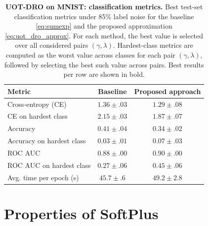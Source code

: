 \documentclass{article}
\theoremstyle{plain}
\theoremstyle{definition}
\theoremstyle{remark}
\begin{document}
\begin{table}
\centering
\small
\setlength{\tabcolsep}{5pt}
\caption{\textbf{UOT-DRO on MNIST: classification metrics.}
Best test-set classification metrics under 85\% label noise for the baseline \eqref{eq:sumexp} and the proposed approximation \eqref{eq:uot_dro_approx}. For each method, the best value is selected over all considered pairs $(\gamma,\lambda)$. Hardest-class metrics are computed as the worst value across classes for each pair $(\gamma,\lambda)$, followed by selecting the best such value across pairs. Best results per row are shown in bold.}
\label{tab:app_uot_dro_mnist_metrics}
\begin{tabular}{l|c|c}
\toprule
Metric & Baseline & Proposed approach \\
\midrule
Cross-entropy (CE)
& $1.36\pm.03$
& $\bm{1.29\pm.08}$ \\
CE on hardest class
& $2.15\pm.03$
& $\bm{1.87\pm.07}$ \\
Accuracy
& $\bm{0.41\pm.04}$
& $0.34\pm.02$ \\
Accuracy on hardest class
& $0.03\pm.01$
& $\bm{0.07\pm.03}$ \\
ROC AUC
& $0.88\pm.00$
& $\bm{0.90\pm.00}$ \\
ROC AUC on hardest class
& $0.27\pm.06$
& $\bm{0.45\pm.06}$ \\
\midrule
Avg. time per epoch (s)
& $\bm{45.7\pm.6}$
& $49.2\pm2.8$ \\
\bottomrule
\end{tabular}
\end{table}



\section{Properties of SoftPlus}\label{app:softplus}
\end{document}
